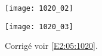 

\ifprof
\else
\begin{center}
\texttt{[image: 1020\_02]}
\end{center}
\begin{center}
\texttt{[image: 1020\_03]}
\end{center}

\fi

\ifprof
\else

\footnotesize
\normalsize


\begin{flushright}
\footnotesize{Corrigé  voir \ref{E2:05:1020}.}
\end{flushright}%
\fi